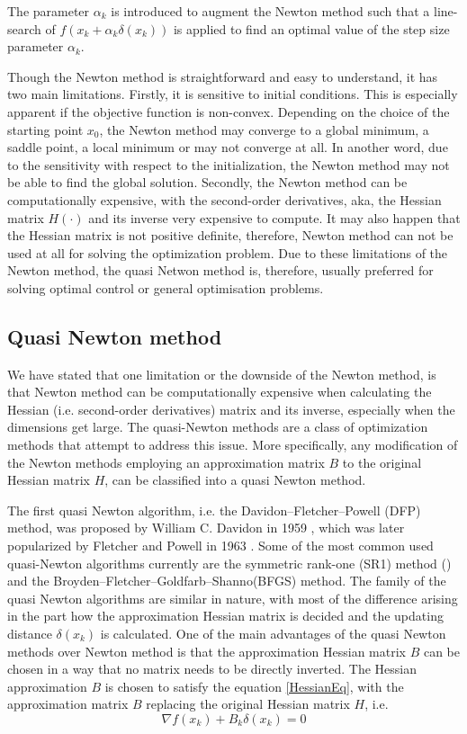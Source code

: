 \documentclass  [
  paper    = a4,
  BCOR     = 10mm,
  twoside,
  fontsize = 12pt,
  fleqn,
  toc      = bibnumbered,
  toc      = listofnumbered,
  numbers  = noendperiod,
  headings = normal,
  listof   = leveldown,
  version  = 3.03
]                                       {scrreprt}
\newcommand{\<}{\langle}
\renewcommand{\>}{\rangle}
\begin{document}
The parameter $\alpha_k$ is introduced to augment the Newton method such that a line-search of $f(x_k + \alpha_k \delta(x_k))$ is applied to find an optimal value of the step size parameter $\alpha_k$. 

Though the Newton method is straightforward and easy to understand, it has two main limitations. Firstly, it is sensitive to initial conditions. This is especially apparent if the objective function is non-convex. Depending on the choice of the starting point $x_0$, the Newton method may converge to a global minimum, a saddle point, a local minimum or may not converge at all. In another word, due to the sensitivity with respect to the initialization, the Newton method may not be able to find the global solution. Secondly, the Newton method can be computationally expensive, with the second-order derivatives, aka, the Hessian matrix $H(\cdot)$ and its inverse very expensive to compute. It may also happen that the Hessian matrix is not positive definite, therefore, Newton method can not be used at all for solving the optimization problem. Due to these limitations of the Newton method, the quasi Netwon method is, therefore, usually preferred for solving optimal control or general optimisation problems. 

\subsection{Quasi Newton method}
We have stated that one limitation or the downside of the Newton method, is that Newton method can be computationally expensive when calculating the Hessian (i.e. second-order derivatives)  matrix and its inverse, especially when the dimensions get large. The quasi-Newton methods are a class of optimization methods that attempt to address this issue. More specifically, any modification of the Newton methods employing an approximation matrix $B$ to the original Hessian matrix $H$, can be classified into a quasi Newton method. 

The first quasi Newton algorithm, i.e. the Davidon–Fletcher–Powell (DFP) method, was proposed by William C. Davidon in 1959 \cite{WilDav59}, which was later popularized by Fletcher and Powell in 1963 \cite{FlePow63}. Some of the most common used quasi-Newton algorithms currently are the symmetric rank-one (SR1) method (\cite{ANP91}) and the Broyden–Fletcher–Goldfarb–Shanno(BFGS) method. The family of the quasi Newton algorithms are similar in nature, with most of the difference arising in the part how the approximation Hessian matrix is decided and the updating distance $\delta(x_k) $ is calculated. One of the main advantages of the quasi Newton methods over Newton method is that the approximation Hessian matrix $B$ can be chosen in a way that no matrix needs to be directly inverted. The Hessian approximation $B$ is chosen to satisfy the equation \ref{HessianEq}, with the approximation matrix $B$ replacing the original Hessian matrix $H$, i.e. 
\begin{equation}
	\nabla f(x_k) +B_k\delta(x_k) =0
	\label{HessianAppro}
\end{equation}
\end{document}

